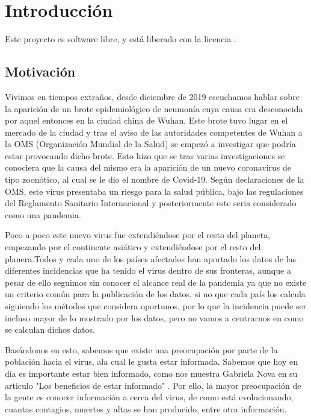 \chapter{Introducción}

Este proyecto es software libre, y está liberado con la licencia \cite{gplv3}.

\section{Motivación}

Vivimos en tiempos extraños, desde diciembre de 2019 escuchamos hablar sobre la aparición de un brote epidemiológico de neumonía cuya causa era desconocida por aquel entonces en la ciudad china de Wuhan. Este brote tuvo lugar en el mercado de la ciudad y tras el aviso de las autoridades competentes de Wuhan a la OMS (Organización Mundial de la Salud) se empezó a investigar que podría estar provocando dicho brote. Esto hizo que se tras varias investigaciones se conociera que la causa del mismo era la aparición de un nuevo coronavirus \cite{oms-covid} de tipo zoonótico, al cual se le dio el nombre de Covid-19. Según declaraciones de la OMS, este virus presentaba un riesgo para la salud pública, bajo las regulaciones del Reglamento Sanitario Internacional \cite{reglamento-sanitario-internacional} y posteriormente este seria considerado como una pandemia.

Poco a poco este nuevo virus fue extendiéndose por el resto del planeta, empezando por el continente asiático y extendiéndose por el resto del planera.Todos y cada uno de los países afectados han aportado los datos de las diferentes incidencias que ha tenido el virus dentro de sus fronteras, aunque a pesar de ello seguimos sin conocer el alcance real de la pandemia ya que no existe un criterio común para la publicación de los datos, si no que cada país los calcula siguiendo los métodos que considera oportunos, por lo que la incidencia puede ser incluso mayor de lo mostrado por los datos, pero no vamos a centrarnos en como se calculan dichos datos.

Basándonos en esto, sabemos que existe una preocupación por parte de la población hacia el virus, ala cual le gusta estar informada. Sabemos que hoy en día es importante estar bien informado, como nos muestra Gabriela Nova en su articulo "Los beneficios de estar informado" \cite{gabriela-nova}. Por ello, la mayor preocupación de la gente es conocer información a cerca del virus, de como está evolucionando, cuantas contagios, muertes y altas se han producido, entre otra información.

